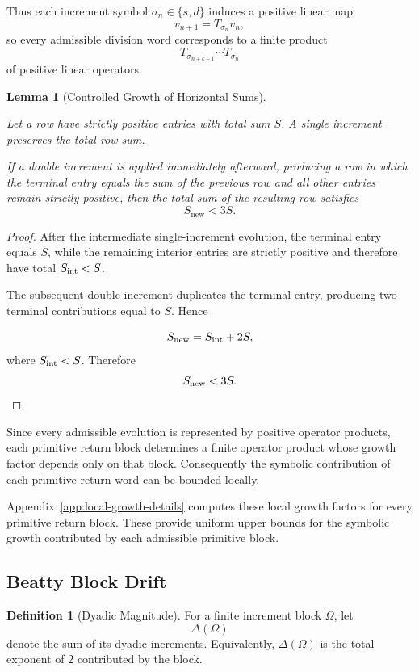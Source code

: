 \documentclass[12pt, oneside]{article}
\numberwithin{equation}{section}
\theoremstyle{definition}
\newtheorem{definition}{Definition}[section]
\theoremstyle{plain}
\newtheorem{lemma}[theorem]{Lemma}
\theoremstyle{remark}
\begin{document}
Thus each increment symbol $\sigma_n\in\{s,d\}$ induces a positive linear map
\[
v_{n+1}=T_{\sigma_n}v_n,
\]
so every admissible division word corresponds to a finite product
\[
T_{\sigma_{n+k-1}}\cdots T_{\sigma_n}
\]
of positive linear operators.

\begin{lemma}[Controlled Growth of Horizontal Sums]
\label{lem:controlled-horizontal-growth}

Let a row have strictly positive entries with total sum $S$.
A single increment preserves the total row sum.

If a double increment is applied immediately afterward, producing a row in which
the terminal entry equals the sum of the previous row and all other entries remain
strictly positive, then the total sum of the resulting row satisfies
\[
S_{\mathrm{new}} < 3S.
\]
\end{lemma}

\begin{proof}
After the intermediate single-increment evolution, the terminal entry equals
\(S\), while the remaining interior entries are strictly positive and therefore
have total \(S_{\rm int}<S\).

The subsequent double increment duplicates the terminal entry, producing two
terminal contributions equal to \(S\). Hence

\[
S_{\rm new}
=
S_{\rm int}+2S,
\]
where \(S_{\rm int}<S\). Therefore
\[
S_{\rm new}<3S.
\]
\end{proof}

Since every admissible evolution is represented by positive operator products,
each primitive return block determines a finite operator product whose growth
factor depends only on that block. Consequently the symbolic contribution of
each primitive return word can be bounded locally.

Appendix~\ref{app:local-growth-details} computes these local growth factors for
every primitive return block. These provide uniform upper bounds for the symbolic
growth contributed by each admissible primitive block.


\subsection{Beatty Block Drift}

\begin{definition}[Dyadic Magnitude]
For a finite increment block $\Omega$, let
\[
\Delta(\Omega)
\]
denote the sum of its dyadic increments.
Equivalently, $\Delta(\Omega)$ is the total exponent of $2$
contributed by the block.
\end{definition}
\end{document}
